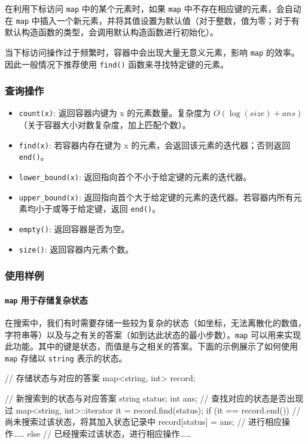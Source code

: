 在利用下标访问 \texttt{map} 中的某个元素时，如果 \texttt{map} 中不存在相应键的元素，会自动在 \texttt{map} 中插入一个新元素，并将其值设置为默认值（对于整数，值为零；对于有默认构造函数的类型，会调用默认构造函数进行初始化）。

当下标访问操作过于频繁时，容器中会出现大量无意义元素，影响 \texttt{map} 的效率。因此一般情况下推荐使用 \texttt{find()} 函数来寻找特定键的元素。

\subsubsection{查询操作}\label{ux67e5ux8be2ux64cdux4f5c}

\begin{itemize}
\tightlist
\item
  \texttt{count(x)}: 返回容器内键为 x 的元素数量。复杂度为 \(O(\log(size)+ans)\)（关于容器大小对数复杂度，加上匹配个数）。
\item
  \texttt{find(x)}: 若容器内存在键为 x 的元素，会返回该元素的迭代器；否则返回 \texttt{end()}。
\item
  \texttt{lower\_bound(x)}: 返回指向首个不小于给定键的元素的迭代器。
\item
  \texttt{upper\_bound(x)}: 返回指向首个大于给定键的元素的迭代器。若容器内所有元素均小于或等于给定键，返回 \texttt{end()}。
\item
  \texttt{empty()}: 返回容器是否为空。
\item
  \texttt{size()}: 返回容器内元素个数。
\end{itemize}

\subsubsection{使用样例}\label{ux4f7fux7528ux6837ux4f8b-1}

\paragraph{\texorpdfstring{\texttt{map} 用于存储复杂状态}{map 用于存储复杂状态}}\label{map-ux7528ux4e8eux5b58ux50a8ux590dux6742ux72b6ux6001}

在搜索中，我们有时需要存储一些较为复杂的状态（如坐标，无法离散化的数值，字符串等）以及与之有关的答案（如到达此状态的最小步数）。\texttt{map} 可以用来实现此功能。其中的键是状态，而值是与之相关的答案。下面的示例展示了如何使用 \texttt{map} 存储以 \texttt{string} 表示的状态。


\begin{codeline}
// 存储状态与对应的答案
map<string, int> record;

// 新搜索到的状态与对应答案
string status;
int ans;
// 查找对应的状态是否出现过
map<string, int>::iterator it = record.find(status);
if (it == record.end()) {
  // 尚未搜索过该状态，将其加入状态记录中
  record[status] = ans;
  // 进行相应操作……
} else {
  // 已经搜索过该状态，进行相应操作……
}
\end{codeline}


